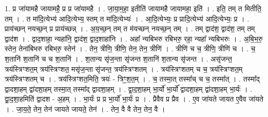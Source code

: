 \documentclass[17pt]{extarticle}
\begin{document}
1. प्र जा॑यामहै जायामहै॒ प्र प्र जा॑यामहै । . जा॒या॒म॒हा॒ इतीति॑ जायामहै जायामहा॒ इति॑ । . इति॒ तम् त मितीति॒ तम् । . त मा॑दि॒त्येभ्य॑ आदि॒त्येभ्य॒ स्तम् त मा॑दि॒त्येभ्यः॑ । . आ॒दि॒त्येभ्यः॒ प्र प्रादि॒त्येभ्य॑ आदि॒त्येभ्यः॒ प्र । . प्राय॑च्छन् नयच्छ॒न् प्र प्राय॑च्छन्न् । . अ॒य॒च्छ॒न् तम् त म॑यच्छन् नयच्छ॒न् तम् । . तम् द्वाद॑श॒ द्वाद॑श॒ तम् तम् द्वाद॑श । . द्वाद॒शाहा॒ न्यहा॑नि॒ द्वाद॑श॒ द्वाद॒शाहा॑नि । . अहा᳚ न्यबिभरु रबिभरु॒ रहा॒ न्यहा᳚ न्यबिभरुः । . अ॒बि॒भ॒रु॒ स्तेन॒ तेना॑बिभरु रबिभरु॒ स्तेन॑ । . तेन॒ त्रीणि॒ त्रीणि॒ तेन॒ तेन॒ त्रीणि॑ । . त्रीणि॑ च च॒ त्रीणि॒ त्रीणि॑ च । . च॒ श॒तानि॑ श॒तानि॑ च च श॒तानि॑ । . श॒तान्य सृ॑ज॒न्ता सृ॑जन्त श॒तानि॑ श॒तान्य सृ॑जन्त । . असृ॑जन्त॒ त्रय॑स्त्रिꣳशत॒म् त्रय॑स्त्रिꣳशत॒ मसृ॑ज॒न्ता सृ॑जन्त॒ त्रय॑स्त्रिꣳशतम् । . त्रय॑स्त्रिꣳशतम् च च॒ त्रय॑स्त्रिꣳशत॒म् त्रय॑स्त्रिꣳशतम् च । . त्रय॑स्त्रिꣳशत॒मिति॒ त्रयः॑ - त्रिꣳ॒॒श॒त॒म् । . च॒ तस्मा॒त् तस्मा᳚च् च च॒ तस्मा᳚त् । . तस्मा᳚द् द्वादशा॒हम् द्वा॑दशा॒हम् तस्मा॒त् तस्मा᳚द् द्वादशा॒हम् । . द्वा॒द॒शा॒हम् भा॒र्यो॑ भा॒र्यो᳚ द्वादशा॒हम् द्वा॑दशा॒हम् भा॒र्यः॑ । . द्वा॒द॒शा॒हमिति॑ द्वादश - अ॒हम् । . भा॒र्यः॑ प्र प्र भा॒र्यो॑ भा॒र्यः॑ प्र । . प्रैवैव प्र प्रैव । . ए॒व जा॑यते जायत ए॒वैव जा॑यते । . जा॒य॒ते॒ तेन॒ तेन॑ जायते जायते॒ तेन॑ । . तेन॒ वै वै तेन॒ तेन॒ वै । \newline
\end{document}
